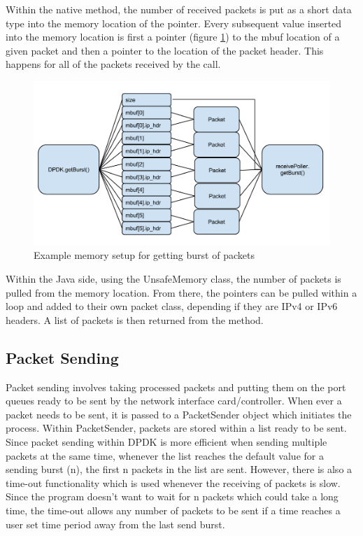 \documentclass[final_report.tex]{subfiles}
\begin{document}
Within the native method, the number of received packets is put as a short data type into the memory location of the pointer. Every subsequent value inserted into the memory location is first a pointer (figure \ref{fig:dpdk_mem}) to the mbuf location of a given packet and then a pointer to the location of the packet header. This happens for all of the packets received by the call.

\begin{figure}[H]
	\centering
	\includegraphics[width=\textwidth]{img/memory.png}
	\caption{Example memory setup for getting burst of packets}
	\label{fig:dpdk_mem}
\end{figure}

Within the Java side, using the UnsafeMemory class, the number of packets is pulled from the memory location. From there, the pointers can be pulled within a loop and added to their own packet class, depending if they are IPv4 or IPv6 headers. A list of packets is then returned from the method.

\subsection{Packet Sending}
Packet sending involves taking processed packets and putting them on the port queues ready to be sent by the network interface card/controller. When ever a packet needs to be sent, it is passed to a PacketSender object which initiates the process. Within PacketSender, packets are stored within a list ready to be sent. Since packet sending within DPDK is more efficient when sending multiple packets at the same time, whenever the list reaches the default value for a sending burst (n), the first n packets in the list are sent. However, there is also a time-out functionality which is used whenever the receiving of packets is slow. Since the program doesn't want to wait for n packets which could take a long time, the time-out allows any number of packets to be sent if a time reaches a user set time period away from the last send burst.
\end{document}
